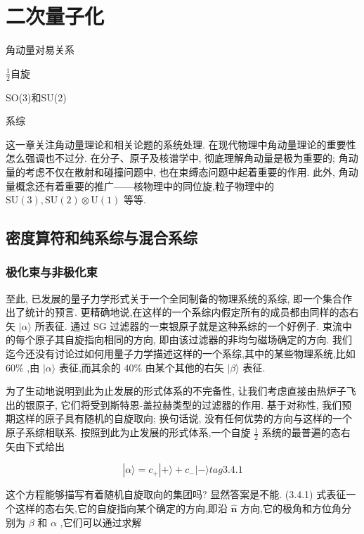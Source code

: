 \ifx\allfiles\undefined



	\else
	\fi
\chapter{二次量子化}
\begin{introduction}
	\item 角动量对易关系
	\item $\frac12$自旋
	\item SO(3)和SU(2)
	\item 系综
\end{introduction}
这一章关注角动量理论和相关论题的系统处理. 在现代物理中角动量理论的重要性怎么强调也不过分. 在分子、原子及核谱学中, 彻底理解角动量是极为重要的; 角动量的考虑不仅在散射和碰撞问题中, 也在束缚态问题中起着重要的作用. 此外, 角动量概念还有着重要的推广——核物理中的同位旋,粒子物理中的 $\mathrm{{SU}}\left( 3\right) ,\mathrm{{SU}}\left( 2\right) \otimes \mathrm{U}\left( 1\right)$ 等等.

\section{密度算符和纯系综与混合系综}
\subsection{极化束与非极化束}

至此, 已发展的量子力学形式关于一个全同制备的物理系统的系综, 即一个集合作出了统计的预言. 更精确地说,在这样的一个系综内假定所有的成员都由同样的态右矢 $|\alpha \rangle$ 所表征. 通过 $\mathrm{{SG}}$ 过滤器的一束银原子就是这种系综的一个好例子. 束流中的每个原子其自旋指向相同的方向, 即由该过滤器的非均匀磁场确定的方向. 我们迄今还没有讨论过如何用量子力学描述这样的一个系综,其中的某些物理系统,比如 ${60}\%$ ,由 $|\alpha \rangle$ 表征,而其余的 ${40}\%$ 由某个其他的右矢 $|\beta \rangle$ 表征.

为了生动地说明到此为止发展的形式体系的不完备性, 让我们考虑直接由热炉子飞出的银原子, 它们将受到斯特恩-盖拉赫类型的过滤器的作用. 基于对称性, 我们预期这样的原子具有随机的自旋取向; 换句话说, 没有任何优势的方向与这样的一个原子系综相联系. 按照到此为止发展的形式体系,一个自旋 $\frac{1}{2}$ 系统的最普遍的态右矢由下式给出

$$
\left| {\alpha \rangle = {c}_{ + }}\right| + \rangle + {c}_{ - }| - \rangle tag{3. 4.1}
$$

这个方程能够描写有着随机自旋取向的集团吗? 显然答案是不能. (3.4.1) 式表征一个这样的态右矢,它的自旋指向某个确定的方向,即沿 $\widehat{\mathbf{n}}$ 方向,它的极角和方位角分别为 $\beta$ 和 $\alpha$ ,它们可以通过求解

